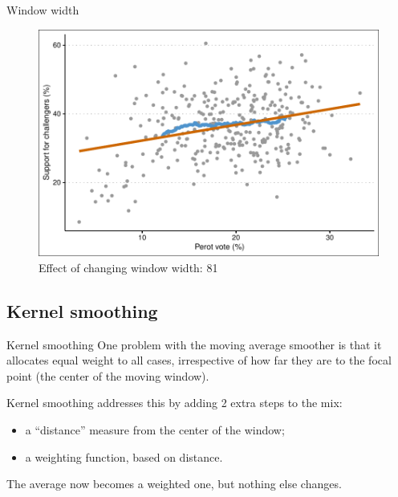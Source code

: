 \documentclass[12pt,english,pdf,xcolor=dvipsnames,aspectratio=169,handout]{beamer}\usepackage[]{graphicx}\usepackage[]{xcolor}
\begin{document}
\begin{frame}{Window width}

\begin{figure}
  \centering
  \includegraphics[scale=0.7]{../04-graphs/04-05b}
  \caption{Effect of changing window width: 81}
\end{figure}
  
\end{frame}



\subsection{Kernel smoothing}
\begin{frame}{Kernel smoothing}
  One problem with the moving average smoother is that it allocates equal weight to all cases, irrespective of how far they are to the focal point (the center of the moving window).\bigskip

  Kernel smoothing addresses this by adding 2 extra steps to the mix:

  \begin{itemize}
  \item a ``distance'' measure from the center of the window;
  \item a weighting function, based on distance.
  \end{itemize}\bigskip

  The average now becomes a weighted one, but nothing else changes.
\end{frame}
\end{document}
